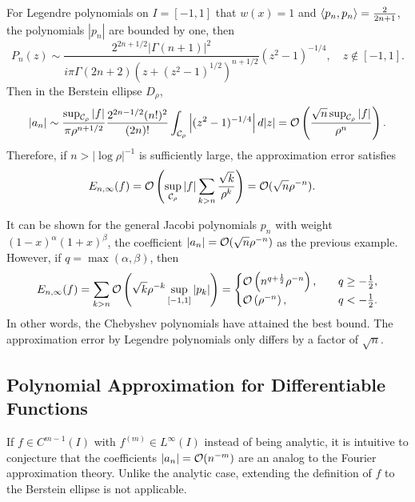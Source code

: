 \begin{example}
    For Legendre polynomials on $I = [-1, 1]$ that $w(x) = 1$ and $\langle {p_n, p_n} \rangle = \frac{2}{2n+1}$, the polynomials $|p_n|$ are bounded by one, then 
    \begin{equation}
        P_n(z) \sim \frac{2^{2n+1/2}|\Gamma(n+1)|^2}{i\pi \Gamma(2n+2)(z+(z^2-1)^{1/2})^{n+1/2}} (z^2-1)^{-1/4},\quad z\notin [-1,1].
    \end{equation}
    Then in the Berstein ellipse $D_{\rho}$, 
    \begin{equation}
        |a_n|\sim \frac{\sup_{\mathcal C_{\rho}}|f|}{\pi \rho^{n + 1/2} } \frac{2^{2n-1/2}(n!)^2 }{ (2n)!  }\int_{\mathcal C_{\rho}} \left|(z^2 - 1)^{-1/4}\right| d|z| = \mathcal O\left(\frac{\sqrt{ n}\sup_{\mathcal C_{\rho}}|f|}{\rho^n}\right).
    \end{equation}
    Therefore, if $n > |\log \rho|^{-1}$ is sufficiently large, the approximation error satisfies
    \begin{equation}
    \begin{aligned}
        E_{n,\infty}(f) &= \mathcal O\left(\sup_{\mathcal C_{\rho} } |f| \sum_{k>n}\frac{\sqrt{k}}{\rho^k}\right) = \mathcal O(\sqrt{n}\rho^{-n}).
    \end{aligned}
    \end{equation}
\end{example}
\begin{remark}
    It can be shown for the general Jacobi polynomials $p_n$ with weight $(1-x)^{\alpha}(1+x)^{\beta}$, the coefficient 
    $|a_n| = \mathcal O(\sqrt{n} \rho^{-n} )$ as the previous example. However, if $q = \max(\alpha, \beta)$, then 
    \begin{equation}
        E_{n,\infty}(f) = \sum_{k>n} \mathcal O\left(\sqrt{k} \rho^{-k} \sup_{[-1,1]} |p_k|\right) = \begin{cases}
            \mathcal O\left( n^{q+\frac{1}{2}}\rho^{-n}\right),\quad & q\ge -\frac{1}{2},        \\
             \mathcal O\left( \rho^{-n} \right),\quad & q < -\frac{1}{2}. 
            \end{cases}
    \end{equation}
    In other words, the Chebyshev polynomials have attained the best bound. The approximation error by Legendre polynomials only differs by a factor of $\sqrt{n}$. 
\end{remark}
\subsection{Polynomial Approximation for Differentiable Functions}
If $f\in C^{m-1}(I)$ with $f^{(m)}\in L^{\infty}(I)$ instead of being analytic, it is intuitive to conjecture that the coefficients $|a_n| = \mathcal O(n^{-m})$ are an analog to the Fourier approximation theory. Unlike the analytic case, extending the definition of $f$ to the Berstein ellipse is not applicable. 

